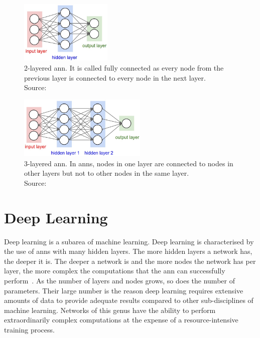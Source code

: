 \documentclass[
			   fontsize=11pt,
               paper=a4,
               bibliography=totoc,
               idxtotoc,
               headsepline,
               footsepline,
               footinclude=false,
               BCOR=12mm,
               DIV=13,
               openany,   %
               oneside    %
               ]
               {scrbook}
\begin{document}
\begin{multicols}{2} %
	\begin{figure}[H] %
		\centering
		\includegraphics[height=3cm]{figures/ann1.jpeg}
		\caption[2-Layered ANN]{2-layered \gls{ann}. It is called fully connected as every node from the previous layer is connected to every node in the next layer. \\
			\tiny{Source:~\cite{annGraphics}}}
		\label{fig:2layeredANN} %
	\end{figure}
	
	\columnbreak    %
	
	\begin{figure}[H] %
		\centering
		\includegraphics[height=3cm]{figures/ann2.jpeg}
		\caption[3-Layered ANN]{3-layered \gls{ann}. In \glspl{ann}, nodes in one layer are connected to nodes in other layers but not to other nodes in the same layer. \\
			\tiny{Source:~\cite{annGraphics}}}
		\label{fig:3layeredANN} %
	\end{figure}
\end{multicols}

\newpage

\section{Deep Learning}

Deep learning is a subarea of machine learning. Deep learning is characterised by the use of \glspl{ann} with many hidden layers. The more hidden layers a network has, the deeper it is. The deeper a network is and the more nodes the network has per layer, the more complex the computations that the \gls{ann} can successfully perform~\cite{dlBookGoodf}. As the number of layers and nodes grows, so does the number of parameters. Their large number is the reason deep learning requires extensive amounts of data to provide adequate results compared to other sub-disciplines of machine learning. Networks of this genus have the ability to perform extraordinarily complex computations at the expense of a resource-intensive training process.
\end{document}
